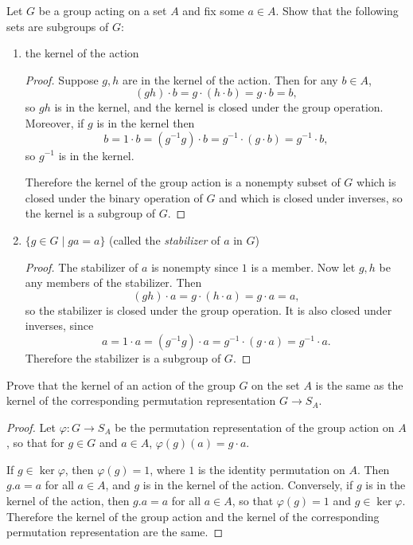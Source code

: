  Let $G$ be a group acting on a set $A$ and fix some
$a\in A$. Show that the following sets are subgroups of $G$:
\begin{enumerate}
\item the kernel of the action
  \begin{proof}
    Suppose $g,h$ are in the kernel of the action. Then for any $b\in A$,
    \begin{equation*}
      (gh)\cdot b = g\cdot(h\cdot b) = g\cdot b = b,
    \end{equation*}
    so $gh$ is in the kernel, and the kernel is closed under the group
    operation. Moreover, if $g$ is in the kernel then
    \begin{equation*}
      b = 1\cdot b = (g^{-1}g)\cdot b
      = g^{-1}\cdot(g\cdot b) = g^{-1}\cdot b,
    \end{equation*}
    so $g^{-1}$ is in the kernel.

    Therefore the kernel of the group action is a nonempty subset of
    $G$ which is closed under the binary operation of $G$ and which is
    closed under inverses, so the kernel is a subgroup of $G$.
  \end{proof}
\item $\{g\in G\mid ga = a\}$ (called the {\em stabilizer} of $a$ in $G$)
  \begin{proof}
    The stabilizer of $a$ is nonempty since $1$ is a member. Now let
    $g,h$ be any members of the stabilizer. Then
    \begin{equation*}
      (gh)\cdot a = g\cdot(h\cdot a) = g\cdot a = a,
    \end{equation*}
    so the stabilizer is closed under the group operation. It is also
    closed under inverses, since
    \begin{equation*}
      a = 1\cdot a = (g^{-1}g)\cdot a
      = g^{-1}\cdot(g\cdot a) = g^{-1}\cdot a.
    \end{equation*}
    Therefore the stabilizer is a subgroup of $G$.
  \end{proof}
\end{enumerate}

 Prove that the kernel of an action of the group $G$ on the
set $A$ is the same as the kernel of the corresponding permutation
representation $G\to S_A$.
\begin{proof}
  Let $\varphi\colon G\to S_A$ be the permutation representation of
  the group action on $A$, so that for $g\in G$ and $a\in A$,
  $\varphi(g)(a) = g\cdot a$.

  If $g\in\ker\varphi$, then $\varphi(g) = 1$, where $1$ is the
  identity permutation on $A$. Then $g.a = a$ for all $a\in A$, and
  $g$ is in the kernel of the action. Conversely, if $g$ is in the
  kernel of the action, then $g.a = a$ for all $a\in A$, so that
  $\varphi(g) = 1$ and $g\in\ker\varphi$. Therefore the kernel of the
  group action and the kernel of the corresponding permutation
  representation are the same.
\end{proof}

